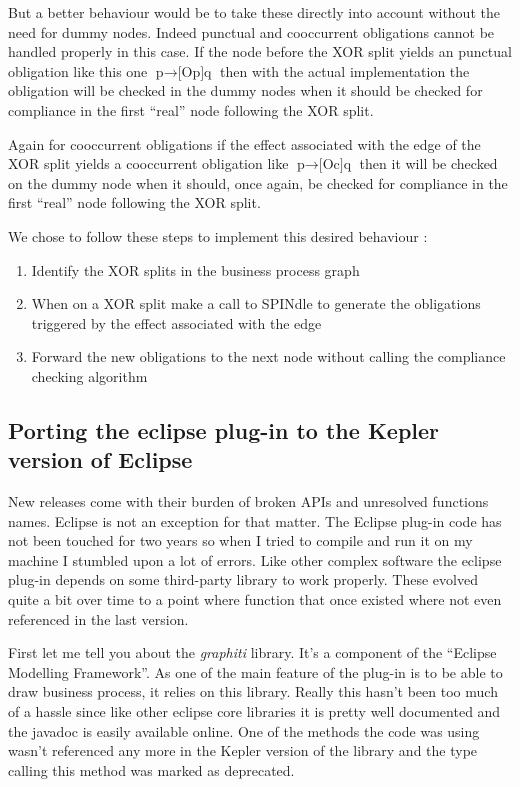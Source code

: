 \documentclass[10pt]{report}
\begin{document}
But a better behaviour would be to take these directly into account without the need for dummy nodes. Indeed punctual and cooccurrent obligations cannot be handled properly in this case. If the node before the XOR split yields an punctual obligation like this one $\text{p} \rightarrow \text{[Op]q}$ then with the actual implementation the obligation will be checked in the dummy nodes when it should be checked for compliance in the first \enquote{real} node following the XOR split.

Again for cooccurrent obligations if the effect associated with the edge of the XOR split yields a cooccurrent obligation like $\text{p} \rightarrow \text{[Oc]q}$ then it will be checked on the dummy node when it should, once again, be checked for compliance in the first \enquote{real} node following the XOR split.

We chose to follow these steps to implement this desired behaviour :
\begin{enumerate}
\item Identify the XOR splits in the business process graph
\item When on a XOR split make a call to SPINdle to generate the obligations triggered by the effect associated with the edge
\item Forward the new obligations to the next node without calling the compliance checking algorithm
\end{enumerate}


\subsection{Porting the eclipse plug-in to the Kepler version of Eclipse}

New releases come with their burden of broken APIs and unresolved functions names. Eclipse is not an exception for that matter. The Eclipse plug-in code has not been touched for two years so when I tried to compile and run it on my machine I stumbled upon a lot of errors. Like other complex software the eclipse plug-in depends on some third-party library to work properly. These evolved quite a bit over time to a point where function that once existed where not even referenced in the last version.

First let me tell you about the \textit{graphiti} library. It's a component of the \enquote{Eclipse Modelling Framework}. As one of the main feature of the plug-in is to be able to draw business process, it relies on this library. Really this hasn't been too much of a hassle since like other eclipse core libraries it is pretty well documented and the javadoc is easily available online. One of the methods the code was using wasn't referenced any more in the Kepler version of the library and the type calling this method was marked as deprecated. 
\end{document}
